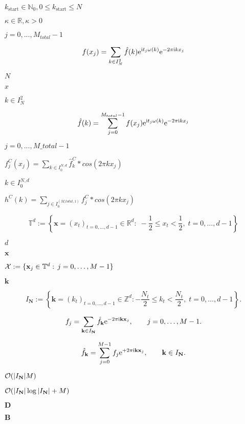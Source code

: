 \documentclass{article}
\begin{document}
$k_{\text{start}} \in \mathbb{N}_0, 0 \le k_{\text{start}} \le N$
\pagebreak

$\kappa \in \mathbb{R}, \kappa > 0$
\pagebreak

$j=0,...,M_{total}-1$
\pagebreak

\[ f(x_j) = \sum_{k \in I_N^2} \hat{f}(k) {\rm e}^{\mbox{\rm\scriptsize i} t_j \omega(k)} {\rm e}^{-2 \pi \mbox{\rm\scriptsize i} k x_j} \]
\pagebreak

$N$
\pagebreak

$x$
\pagebreak

$k \in I_N^2$
\pagebreak

\[ \hat{f}(k) = \sum_{j=0}^{M_{total}-1} f(x_j) {\rm e}^{\mbox{\rm\scriptsize i} t_j \omega(k)} {\rm e}^{-2 \pi \mbox{\rm\scriptsize i} k x_j} \]
\pagebreak

$j=0,...,M\_total-1$
\pagebreak

$f_j^C(x_j) = \sum_{k \in I_0^{N,d}} \hat{f}_k^C * cos(2 \pi k x_j)$
\pagebreak

$k \in I_0^{N,d}$
\pagebreak

$h^C(k) = \sum_{j \in I_0^{(M\_total,1)}} f_j^C * cos(2 \pi k x_j)$
\pagebreak

\[ \mathbb{T}^d := \left\{ \mathbf{x}=\left(x_t\right)_{t=0,\dots,d-1}\in\mathbb{R}^{d}: \; - \frac{1}{2} \le x_t < \frac{1}{2},\; t=0,\dots,d-1 \right\} \]
\pagebreak

$d$
\pagebreak

$\mathbf{x}$
\pagebreak

${\cal X}:=\{\mathbf{x}_j \in {\mathbb T}^d: \,j=0,\dots,M-1\}$
\pagebreak

$\mathbf{k}$
\pagebreak

\[ I_{\mathbf{N}} := \left\{ \mathbf{k}=\left(k_t\right)_{t=0,\dots,d-1}\in \mathbb{Z}^d: - \frac{N_t}{2} \le k_t < \frac{N_t}{2} ,\;t=0,\dots,d-1 \right\}. \]
\pagebreak

\[ f_j = \sum_{\mathbf{k}\in I_{\mathbf{N}}} \hat{f}_{\mathbf{k}} {\rm e}^{-2\pi{\rm i} \mathbf{k}\mathbf{x}_j}, \qquad j=0,\dots,M-1. \]
\pagebreak

\[ \hat f_{\mathbf{k}}=\sum_{j=0}^{M-1} f_j {\rm e}^{+2\pi{\rm i} \mathbf{k}\mathbf{x}_j}, \qquad \mathbf{k}\in I_{\mathbf{N}}. \]
\pagebreak

${\cal O}(|I_{\mathbf{N}}|M)$
\pagebreak

${\cal O}(|I_{\mathbf{N}}|\log|I_{\mathbf{N}}|+M)$
\pagebreak

$\mathbf{D}$
\pagebreak

$\mathbf{B}$
\pagebreak
\end{document}
